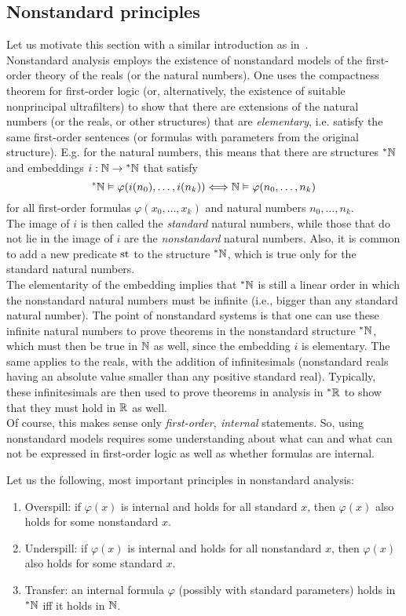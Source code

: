 \subsection{Nonstandard principles}

Let us motivate this section with a similar introduction as in~\cite{BBS12}.\\
Nonstandard analysis employs the existence of nonstandard models of the first-order theory of the reals (or the natural numbers). One uses the compactness theorem for first-order logic (or, alternatively, the existence of suitable nonprincipal ultrafilters) to show that there are extensions of the natural numbers (or the reals, or other structures) that are \emph{elementary}, i.e. satisfy the same first-order sentences (or formulas with parameters from the original structure). E.g. for the natural numbers, this means that there are structures ${}^*\mathbb{N}$ and embeddings $i: \mathbb{N} \to {}^*\mathbb{N}$ that satisfy
\[ {}^*\mathbb{N} \vDash \varphi(i(n_0), \ldots, i(n_k)) \Longleftrightarrow \mathbb{N} \vDash \varphi(n_0, \ldots, n_k) \]
for all first-order formulas $\varphi(x_0, \ldots, x_k)$ and natural numbers $n_0, \ldots, n_k$.\\
The image of $i$ is then called the \emph{standard} natural numbers, while those that do not lie in the image of $i$ are the \emph{nonstandard} natural numbers. Also, it is common to add a new predicate $\operatorname{st}$ to the structure ${}^*\mathbb{N}$, which is true only for the standard natural numbers.\\
The elementarity of the embedding implies that ${}^*\mathbb{N}$ is still a linear order in which the nonstandard natural numbers must be infinite (i.e., bigger than any standard natural number). The point of nonstandard systems is that one can use these infinite natural numbers to prove theorems in the nonstandard structure ${}^*\mathbb{N}$, which must then be true in $\mathbb{N}$ as well, since the embedding $i$ is elementary. The same applies to the reals, with the addition of infinitesimals (nonstandard reals having an absolute value smaller than any positive standard real). Typically, these infinitesimals are then used to prove theorems in analysis in ${}^*\mathbb{R}$ to show that they must hold in $\mathbb{R}$ as well.\\
Of course, this makes sense only \emph{first-order, internal} statements. So, using nonstandard models requires some understanding about what can and what can not be expressed in first-order logic as well as whether formulas are internal.

Let us the following, most important principles in nonstandard analysis:
\begin{enumerate}
\item Overspill: if $\varphi(x)$ is internal and holds for all standard $x$, then $\varphi(x)$ also holds for some nonstandard $x$.
\item Underspill: if $\varphi(x)$ is internal and holds for all nonstandard $x$, then $\varphi(x)$ also holds for some standard $x$.
\item Transfer: an internal formula $\varphi$ (possibly with standard parameters) holds in ${}^*\mathbb{N}$ iff it holds in $\mathbb{N}$.
\end{enumerate}


